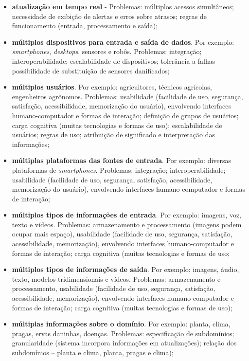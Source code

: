 \documentclass[12pt]{article}
\begin{document}
\begin{itemize}
	\item \textbf{atualização em tempo real} - Problemas: múltiplos acessos simultâneos; necessidade de exibição de alertas e erros sobre atrasos; regras de funcionamento (entrada, processamento e saída);
	\item \textbf{múltiplos dispositivos para entrada e saída de dados}. Por exemplo: \textit{smartphones}, \textit{desktops}, sensores e robôs. Problemas: integração; interoperabilidade; escalabilidade de dispositivos; tolerância a falhas - possibilidade de substituição de sensores danificados;
	\item \textbf{múltiplos usuários}. Por exemplo: agricultores, técnicos agrícolas, engenheiros agrônomos. Problemas: usabilidade (facilidade de uso, segurança, satisfação, acessibilidade, memorização do usuário), envolvendo interfaces humano-computador e formas de interação; definição de grupos de usuários; carga cognitiva (muitas tecnologias e formas de uso); escalabilidade de usuários; regras de uso; atribuição de significado e interpretação das informações;
	\item \textbf{múltiplas plataformas das fontes de entrada}. Por exemplo: diversas plataformas de \textit{smartphones}. Problemas: integração; interoperabilidade; usabilidade (facilidade de uso, segurança, satisfação, acessibilidade, memorização do usuário), envolvendo interfaces humano-computador e formas de interação;
	\item \textbf{múltiplos tipos de informações de entrada}. Por exemplo: imagens, voz, texto e vídeos. Problemas: armazenamento e processamento (imagens podem ocupar mais espaço), usabilidade (facilidade de uso, segurança, satisfação, acessibilidade, memorização), envolvendo interfaces humano-computador e formas de interação; carga cognitiva (muitas tecnologias e formas de uso;
	\item \textbf{múltiplos tipos de informações de saída}. Por exemplo: imagens, áudio, texto, modelos tridimensionais e vídeos. Problemas: armazenamento e processamento, usabilidade (facilidade de uso, segurança, satisfação, acessibilidade, memorização), envolvendo interfaces humano-computador e formas de interação; carga cognitiva (muitas tecnologias e formas de uso);
	\item \textbf{múltiplas informações sobre o domínio}. Por exemplo: planta, clima, pragas, ervas daninhas, doenças. Problemas: especificação de subdomínios; granularidade (sistema incorpora informações em atualizações); relação dos subdomínios – planta e clima, planta, pragas e clima);

\end{itemize}
\end{document}
